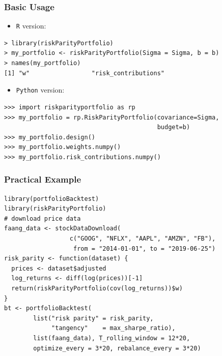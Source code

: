 \documentclass{beamer}
\begin{document}
        \begin{frame}[fragile]
          \frametitle{Basic Usage}
          \vspace{.5cm}
          \begin{itemize}
            \item \texttt{R} version:
          \end{itemize}
            \pause
\begin{verbatim}
> library(riskParityPortfolio)
> my_portfolio <- riskParityPortfolio(Sigma = Sigma, b = b)
> names(my_portfolio)
[1] "w"                 "risk_contributions"
\end{verbatim}
            \pause
          \begin{itemize}
            \item \texttt{Python} version:
          \end{itemize}
\begin{verbatim}
>>> import riskparityportfolio as rp
>>> my_portfolio = rp.RiskParityPortfolio(covariance=Sigma,
                                          budget=b)
>>> my_portfolio.design()
>>> my_portfolio.weights.numpy()
>>> my_portfolio.risk_contributions.numpy()
\end{verbatim}
        \end{frame}

\begin{frame}[fragile]
\frametitle{Practical Example}
\vspace{.7cm}
\begin{verbatim}
library(portfolioBacktest)
library(riskParityPortfolio)
# download price data
faang_data <- stockDataDownload(
                  c("GOOG", "NFLX", "AAPL", "AMZN", "FB"),
                   from = "2014-01-01", to = "2019-06-25")
risk_parity <- function(dataset) {
  prices <- dataset$adjusted
  log_returns <- diff(log(prices))[-1]
  return(riskParityPortfolio(cov(log_returns))$w)
}
bt <- portfolioBacktest(
        list("risk parity" = risk_parity,
             "tangency"    = max_sharpe_ratio),
        list(faang_data), T_rolling_window = 12*20,
        optimize_every = 3*20, rebalance_every = 3*20)
\end{verbatim}
\end{frame}
\end{document}
